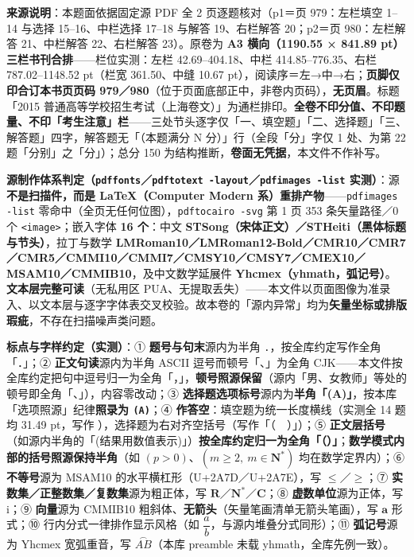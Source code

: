 


\begin{gktip}
\textbf{来源说明}：本题面依据固定源 PDF 全 2 页逐题核对（p1＝页 979：左栏填空 1–14 与选择 15–16、中栏选择 17–18 与解答 19、右栏解答 20；p2＝页 980：左栏解答 21、中栏解答 22、右栏解答 23）。原卷为 \textbf{A3 横向（1190.55 × 841.89 pt）三栏书刊合排}——栏位实测：左栏 42.69–404.18、中栏 414.85–776.35、右栏 787.02–1148.52 pt（栏宽 361.50、中缝 10.67 pt），阅读序＝左→中→右；\textbf{页脚仅印合订本书页页码 979／980}（位于页面底部正中，非卷内页码），\textbf{无页眉}。标题「2015 普通高等学校招生考试（上海卷文）」为通栏排印。\textbf{全卷不印分值、不印题量、不印「考生注意」栏}——三处节头逐字仅「一、填空题」「二、选择题」「三、解答题」四字，解答题无「（本题满分 N 分）」行（全段「分」字仅 1 处、为第 22 题「分别」之「分」）；总分 150 为结构推断，\textbf{卷面无凭据}，本文件不作补写。

\textbf{源制作体系判定（\texttt{pdffonts}／\texttt{pdftotext -layout}／\texttt{pdfimages -list} 实测）}：源\textbf{不是扫描件，而是 LaTeX（Computer Modern 系）重排产物}——\texttt{pdfimages -list} 零命中（全页无任何位图），\texttt{pdftocairo -svg} 第 1 页 353 条矢量路径／0 个 \texttt{<image>}；嵌入字体 \textbf{16 个}：中文 \textbf{STSong（宋体正文）／STHeiti（黑体标题与节头）}，拉丁与数学 \textbf{LMRoman10／LMRoman12-Bold／CMR10／CMR7／CMR5／CMMI10／CMMI7／CMSY10／CMSY7／CMEX10／MSAM10／CMMIB10}，及中文数学延展件 \textbf{Yhcmex（yhmath，弧记号）}。\textbf{文本层完整可读}（无私用区 PUA、无提取丢失）——本文件以页面图像为准录入、以文本层与逐字字体表交叉校验。故本卷的「源内异常」均为\textbf{矢量坐标或排版瑕疵}，不存在扫描噪声类问题。

\textbf{标点与字样约定（实测）}：① \textbf{题号与句末}源内为半角 \texttt{.}，按全库约定写作全角「．」；② \textbf{正文句读}源内为半角 ASCII 逗号而顿号「、」为全角 CJK——本文件按全库约定把句中逗号归一为全角「，」，\textbf{顿号照源保留}（源内「男、女教师」等处的顿号即全角「、」），内容零改动；③ \textbf{选择题选项标号}源内为\textbf{半角「(A)」}，按本库「选项照源」纪律\textbf{照录为 \texttt{(A)}}；④ \textbf{作答空}：填空题为统一长度横线（实测全 14 题均 31.49 pt，写作 \texttt{\gkblank{}}），选择题为右对齐空括号（写作「（　）」）；⑤ \textbf{正文层括号}（如源内半角的「(结果用数值表示)」）\textbf{按全库约定归一为全角「（）」}；\textbf{数学模式内部的括号照源保持半角}（如 \((p>0)\)、\((m\geqslant 2,\ m\in\mathbf{N}^{*})\) 均在数学定界内）；⑥ \textbf{不等号}源为 MSAM10 的水平横杠形（U+2A7D／U+2A7E），写 \(\leqslant\)／\(\geqslant\)；⑦ \textbf{实数集／正整数集／复数集}源为粗正体，写 \(\mathbf{R}\)／\(\mathbf{N}^{*}\)／\(\mathbf{C}\)；⑧ \textbf{虚数单位}源为正体，写 \(\mathrm{i}\)；⑨ \textbf{向量}源为 CMMIB10 粗斜体、\textbf{无箭头}（矢量笔画清单无箭头笔画），写 \(\boldsymbol{a}\) 形式；⑩ 行内分式一律排作显示风格（如 \(\dfrac{a}{b}\)，与源内堆叠分式同形）；⑪ \textbf{弧记号}源为 Yhcmex 宽弧重音，写 \(\overset{\frown}{AB}\)（本库 preamble 未载 yhmath，全库先例一致）。


\end{gktip}
